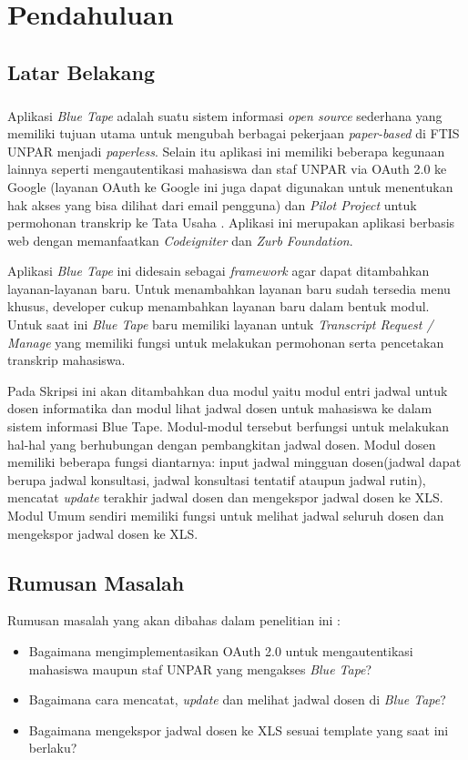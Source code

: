\chapter{Pendahuluan}
\label{chap:intro}
   
\section{Latar Belakang}
\label{sec:label}

\paragraph{} Aplikasi \textit{Blue Tape} adalah suatu sistem informasi \textit{open source} sederhana yang memiliki tujuan utama untuk mengubah berbagai pekerjaan \textit{paper-based} di FTIS UNPAR menjadi \textit{paperless}. Selain itu aplikasi ini memiliki beberapa kegunaan lainnya seperti mengautentikasi mahasiswa dan staf UNPAR via OAuth 2.0 ke Google (layanan OAuth ke Google ini juga dapat digunakan untuk menentukan hak akses yang bisa dilihat dari email pengguna) dan \textit{Pilot Project} untuk permohonan transkrip ke Tata Usaha . Aplikasi ini merupakan aplikasi berbasis web dengan memanfaatkan \textit{Codeigniter} dan \textit{Zurb Foundation}. 

Aplikasi \textit{Blue Tape} ini didesain sebagai \textit{framework} agar dapat ditambahkan layanan-layanan baru. Untuk menambahkan layanan baru sudah tersedia menu khusus, developer cukup menambahkan layanan baru dalam bentuk modul. Untuk saat ini \textit{Blue Tape} baru memiliki layanan untuk \textit{Transcript Request / Manage} yang memiliki fungsi untuk melakukan permohonan serta pencetakan transkrip mahasiswa.

Pada Skripsi ini akan ditambahkan dua modul yaitu modul entri jadwal untuk dosen informatika dan modul lihat jadwal dosen untuk mahasiswa ke dalam sistem informasi Blue Tape. Modul-modul tersebut berfungsi untuk melakukan hal-hal yang berhubungan dengan pembangkitan jadwal dosen. Modul dosen memiliki beberapa fungsi diantarnya: input jadwal mingguan dosen(jadwal dapat berupa jadwal konsultasi, jadwal konsultasi tentatif ataupun jadwal rutin), mencatat \textit{update} terakhir jadwal dosen dan mengekspor jadwal dosen ke XLS. Modul Umum sendiri memiliki fungsi untuk melihat jadwal seluruh dosen dan mengekspor jadwal dosen ke XLS.


\section{Rumusan Masalah}
\label{sec:rumusan}
Rumusan masalah yang akan dibahas dalam penelitian ini :
	\begin{itemize}
		\item Bagaimana mengimplementasikan OAuth 2.0 untuk mengautentikasi mahasiswa maupun staf UNPAR yang mengakses \textit{Blue Tape}?
		\item Bagaimana cara mencatat, \textit{update} dan melihat jadwal dosen di \textit{Blue Tape}?
		\item Bagaimana mengekspor jadwal dosen ke XLS sesuai template yang saat ini berlaku?
	\end{itemize}


